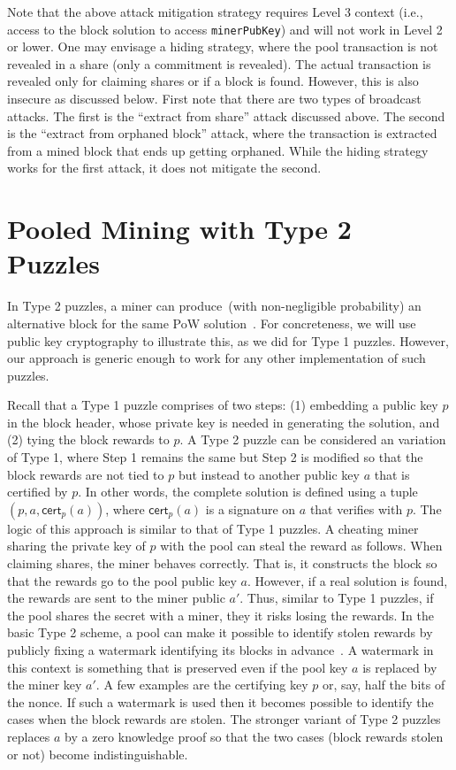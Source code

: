 \documentclass[11pt]{article}
\begin{document}
Note that the above attack mitigation strategy requires Level 3 context (i.e., access to the block solution to access \texttt{minerPubKey}) and will not work in Level 2 or lower. One may envisage a hiding strategy, where the pool transaction is not revealed in a share (only a commitment is revealed). The actual transaction is revealed only for claiming shares or if a block is found. However, this is also insecure as discussed below. First note that there are two types of broadcast attacks. The first is the ``extract from share'' attack discussed above. The second is the ``extract from orphaned block'' attack, where the transaction is extracted from a mined block that ends up getting orphaned. While the hiding strategy works for the first attack, it does not mitigate the second. 

\section{Pooled Mining with Type 2 Puzzles}
In Type 2 puzzles, a miner can produce~(with non-negligible probability) an alternative block for the same PoW solution~\cite{miller2015nonoutsourceable}.
For concreteness, we will use public key cryptography to illustrate this, as we did for Type 1 puzzles. However, our approach is generic enough to work for any other implementation of such puzzles.


Recall that a Type 1 puzzle comprises of two steps: (1) embedding a public key $p$ in the block header, whose private key is needed in generating the solution, and (2) tying the block rewards to $p$. 
A Type 2 puzzle can be considered an variation of Type 1, where Step 1 remains the same but Step 2 is modified so that the block rewards are not tied to $p$ but instead to another public key $a$ that is certified by $p$. In other words, the complete solution is defined using a tuple $(p, a, \textsf{cert}_p(a))$, where $\textsf{cert}_p(a)$ is a signature on $a$ that verifies with $p$. The logic of this approach is similar to that of Type 1 puzzles. A cheating miner sharing the private key of $p$ with the pool can steal the reward as follows. When claiming shares, the miner behaves correctly. That is, it constructs the block so that the rewards go to the pool public key $a$. However, if a real solution is found, the rewards are sent to the miner public $a'$. Thus, similar to Type 1 puzzles, if the pool shares the secret with a miner, they it risks losing the rewards. 
In the basic Type 2 scheme, a pool can make it possible to identify stolen rewards by publicly fixing a watermark identifying its blocks in advance~\cite{miller2015nonoutsourceable}. A watermark in this context is something that is preserved even if the pool key $a$ is replaced by the miner key $a'$. A few examples are the certifying key $p$ or, say, half the bits of the nonce. If such a watermark is used then it becomes possible to identify the cases when the block rewards are stolen. 
The stronger variant of Type 2 puzzles replaces $a$ by a zero knowledge proof so that the two cases (block rewards stolen or not) become indistinguishable. 
\end{document}
